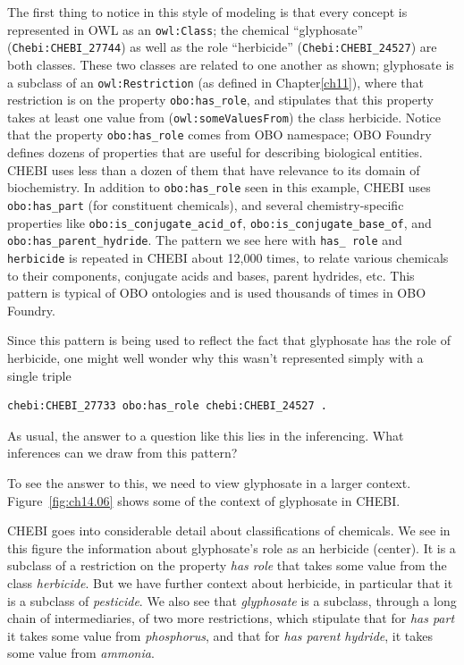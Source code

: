 The first thing to notice in this style of modeling is that every
concept is represented in OWL as an \texttt{owl:Class}; the chemical
``glyphosate'' (\texttt{Chebi:CHEBI\_27744}) as well as the role ``herbicide''
(\texttt{Chebi:CHEBI\_24527}) are both classes. These two classes are related to
one another as shown; glyphosate is a subclass of an \texttt{owl:Restriction} (as
defined in Chapter\ref{ch11}), where that restriction is on the property
\texttt{obo:has\_role}, and stipulates that this property takes at least one
value from (\texttt{owl:someValuesFrom}) the class herbicide. Notice that the
property \texttt{obo:has\_role} comes from OBO namespace; OBO Foundry defines
dozens of properties that are useful for describing biological
entities. CHEBI uses less than a dozen of them that have relevance to
its domain of biochemistry. In addition to \texttt{obo:has\_role} seen in this
example, CHEBI uses \texttt{obo:has\_part} (for constituent chemicals), and
several chemistry-specific properties like \texttt{obo:is\_conjugate\_acid\_of},
\texttt{obo:is\_conjugate\_base\_of}, and \texttt{obo:has\_parent\_hydride}. The pattern
we see here with \texttt{has\_ role} and \texttt{herbicide} is repeated in CHEBI
about 12,000 times, to relate various chemicals to their components,
conjugate acids and bases, parent hydrides, etc. This pattern is typical
of OBO ontologies and is used thousands of times in OBO Foundry.

Since this pattern is being used to reflect the fact that glyphosate has
the role of herbicide, one might well wonder why this wasn't represented
simply with a single triple

\begin{lstlisting}
chebi:CHEBI_27733 obo:has_role chebi:CHEBI_24527 .
\end{lstlisting}

As usual, the answer to a question like this lies in the inferencing.
What inferences can we draw from this pattern?

To see the answer to this, we need to view glyphosate in a larger
context. Figure~\ref{fig:ch14.06} shows some of the context of glyphosate in CHEBI.

CHEBI goes into considerable detail about classifications of chemicals.
We see in this figure the information about glyphosate's role as an
herbicide (center). It is a subclass of a restriction on the property
\textit{has role} that takes some value from the class \textit{herbicide}. But we have
further context about herbicide, in particular that it is a subclass of
\textit{pesticide}. We also see that \textit{glyphosate} is a subclass, through a long
chain of intermediaries, of two more restrictions, which stipulate that
for\textit{ has part} it takes some value from \textit{phosphorus}, and that for\textit{ has
parent hydride}, it takes some value from \textit{ammonia}.


